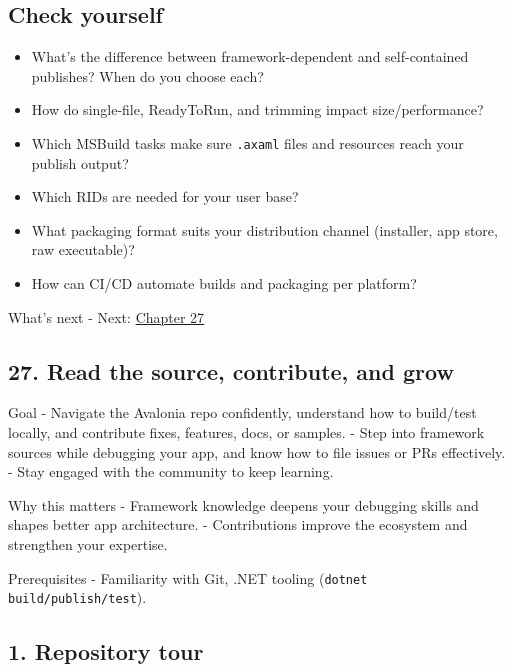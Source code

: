 \subsection{Check yourself}\label{check-yourself-24}

\begin{itemize}
\tightlist
\item
  What's the difference between framework-dependent and self-contained
  publishes? When do you choose each?
\item
  How do single-file, ReadyToRun, and trimming impact size/performance?
\item
  Which MSBuild tasks make sure \passthrough{\lstinline!.axaml!} files
  and resources reach your publish output?
\item
  Which RIDs are needed for your user base?
\item
  What packaging format suits your distribution channel (installer, app
  store, raw executable)?
\item
  How can CI/CD automate builds and packaging per platform?
\end{itemize}

What's next - Next: \href{Chapter27.md}{Chapter 27}

\newpage

\subsection{27. Read the source, contribute, and
grow}\label{read-the-source-contribute-and-grow}

Goal - Navigate the Avalonia repo confidently, understand how to
build/test locally, and contribute fixes, features, docs, or samples. -
Step into framework sources while debugging your app, and know how to
file issues or PRs effectively. - Stay engaged with the community to
keep learning.

Why this matters - Framework knowledge deepens your debugging skills and
shapes better app architecture. - Contributions improve the ecosystem
and strengthen your expertise.

Prerequisites - Familiarity with Git, .NET tooling
(\passthrough{\lstinline!dotnet build/publish/test!}).

\subsection{1. Repository tour}\label{repository-tour}

